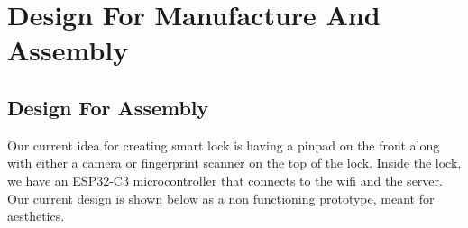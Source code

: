 \section{Design For Manufacture And Assembly}

\subsection{Design For Assembly}

Our current idea for creating smart lock is having a pinpad on the front along with either a camera or fingerprint scanner on the top of the lock. Inside the lock, we have an ESP32-C3 microcontroller that connects to the wifi and the server. Our current design is shown below as a non functioning prototype, meant for aesthetics.

